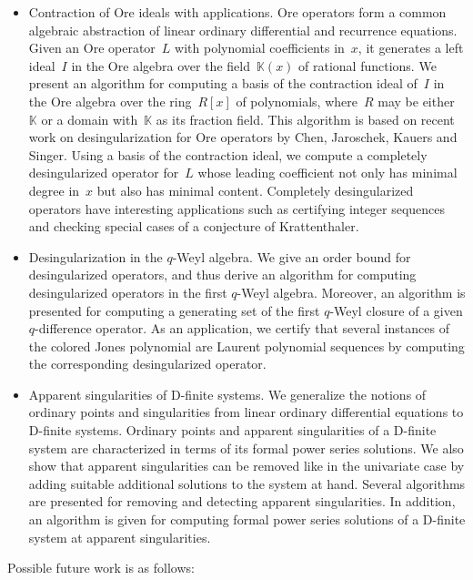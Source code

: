 \documentclass[10pt,a4paper]{article}
\newcommand{\bK}{ {\mathbb  K}}
\begin{document}
\begin{itemize}
\item Contraction of Ore ideals with applications. Ore operators form a common algebraic abstraction of linear ordinary differential and recurrence equations.
Given an Ore operator~$L$ with polynomial coefficients in~$x$, it generates a left ideal~$I$ in the Ore algebra
over the field~$\bK(x)$ of rational functions. We present an algorithm for computing a basis of the contraction ideal of~$I$
in the Ore algebra over the ring~$R[x]$ of polynomials, where~$R$ may be either~$\bK$ or a domain with~$\bK$ as its fraction field.
This algorithm is based on recent work on desingularization for Ore operators by Chen, Jaroschek, Kauers and Singer.
Using a basis of the contraction ideal,
we compute a completely desingularized operator for~$L$ whose leading coefficient not only
has minimal degree in~$x$ but also has minimal content. Completely desingularized operators have interesting applications
such as certifying integer sequences and checking special cases of a conjecture of Krattenthaler.

\item Desingularization in the $q$-Weyl algebra. 
We give an order bound for desingularized operators, and thus derive
an algorithm for computing desingularized operators in the first $q$-Weyl
algebra.  Moreover, an algorithm is presented for computing a generating set
of the first $q$-Weyl closure of a given $q$-difference operator.  As an
application, we certify that several instances of the colored Jones polynomial
are Laurent polynomial sequences by computing the corresponding desingularized
operator.

\item Apparent singularities of D-finite systems. We generalize the notions of  ordinary points and singularities
from linear ordinary differential equations to D-finite systems.
Ordinary points and apparent singularities of a D-finite system are characterized in terms of its formal power series solutions.
We also show that apparent singularities can be removed like in the univariate
case by adding suitable additional solutions to the system at hand.
Several algorithms are presented for removing and detecting apparent singularities.
In addition,  an algorithm is given for computing formal power series solutions of a D-finite system
at apparent singularities.
\end{itemize}

Possible future work is as follows: 
\end{document}
